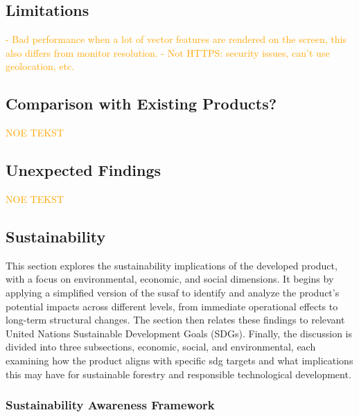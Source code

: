 \subsection{Limitations}


\textcolor{orange}{- Bad performance when a lot of vector features are rendered on the screen, this also differs from monitor resolution. - Not HTTPS: security issues, can't use geolocation, etc.}

\subsection{Comparison with Existing Products?}

\textcolor{orange}{NOE TEKST}

\subsection{Unexpected Findings} %

\textcolor{orange}{NOE TEKST}

\subsection{Sustainability}\label{subsec:discussion:product:sustainability}

This section explores the sustainability implications of the developed product, with a focus on environmental, economic, and social dimensions. It begins by applying a simplified version of the \acrfull{susaf} to identify and analyze the product's potential impacts across different levels, from immediate operational effects to long-term structural changes. The section then relates these findings to relevant United Nations Sustainable Development Goals (SDGs). Finally, the discussion is divided into three subsections, economic, social, and environmental, each examining how the product aligns with specific \acrshort{sdg} targets and what implications this may have for sustainable forestry and responsible technological development.

\subsubsection{Sustainability Awareness Framework}\label{subsubsec:discussion:product:sustainability:susaf}

